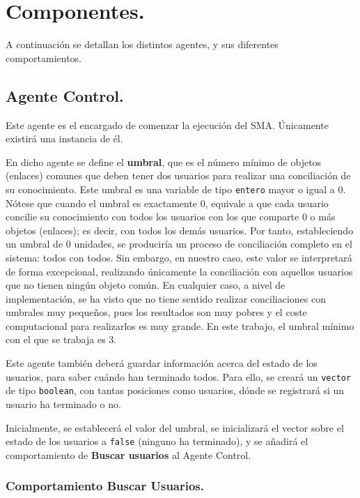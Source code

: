 \section{Componentes.}

A continuación se detallan los distintos agentes, y sus diferentes comportamientos.

\subsection{Agente Control.}

Este agente es el encargado de comenzar la ejecución del SMA. Únicamente existirá una instancia de él.

En dicho agente se define el {\bf umbral}, que es el número mínimo de objetos (enlaces) comunes que deben tener dos usuarios para realizar una conciliación de su conocimiento. Este umbral es una variable de tipo {\tt entero} mayor o igual a 0. Nótese que cuando el umbral es exactamente 0, equivale a que cada usuario concilie su conocimiento con todos los usuarios con los que comparte 0 o más objetos (enlaces); es decir, con todos los demás usuarios. Por tanto, estableciendo un umbral de 0 unidades, se produciría un proceso de conciliación completo en el sistema: todos con todos. Sin embargo, en nuestro caso, este valor se interpretará de forma excepcional, realizando únicamente la conciliación con aquellos usuarios que no tienen ningún objeto común. En cualquier caso, a nivel de implementación, se ha visto que no tiene sentido realizar conciliaciones con umbrales muy pequeños, pues los resultados son muy pobres y el coste computacional para realizarlos es muy grande. En este trabajo, el umbral mínimo con el que se trabaja es 3.

Este agente también deberá guardar información acerca del estado de los usuarios, para saber cuándo han terminado todos. Para ello, se creará un {\tt vector} de tipo {\tt boolean}, con tantas posiciones como usuarios, dónde se registrará si un usuario ha terminado o no.

Inicialmente, se establecerá el valor del umbral, se inicializará el vector sobre el estado de los usuarios a {\tt false} (ninguno ha terminado), y se añadirá el comportamiento de {\bf Buscar usuarios} al Agente Control.

\subsubsection{Comportamiento Buscar Usuarios.}

